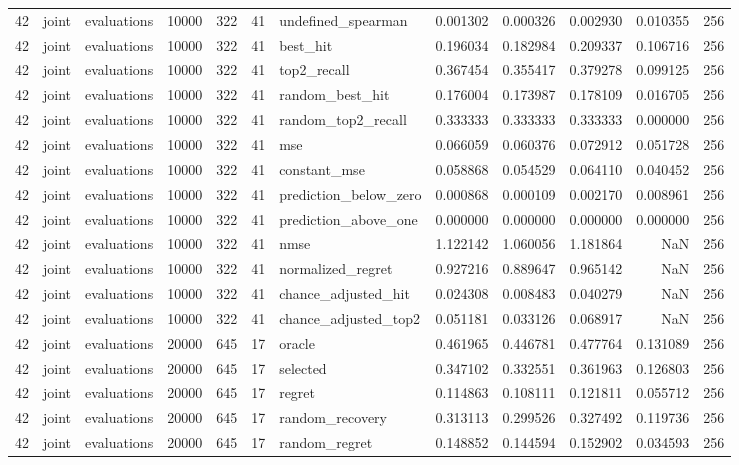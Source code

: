 \begin{tabular}{rllrrrlrrrrr}
42 & joint & evaluations & 10000 & 322 & 41 & undefined_spearman & 0.001302 & 0.000326 & 0.002930 & 0.010355 & 256 \\
42 & joint & evaluations & 10000 & 322 & 41 & best_hit & 0.196034 & 0.182984 & 0.209337 & 0.106716 & 256 \\
42 & joint & evaluations & 10000 & 322 & 41 & top2_recall & 0.367454 & 0.355417 & 0.379278 & 0.099125 & 256 \\
42 & joint & evaluations & 10000 & 322 & 41 & random_best_hit & 0.176004 & 0.173987 & 0.178109 & 0.016705 & 256 \\
42 & joint & evaluations & 10000 & 322 & 41 & random_top2_recall & 0.333333 & 0.333333 & 0.333333 & 0.000000 & 256 \\
42 & joint & evaluations & 10000 & 322 & 41 & mse & 0.066059 & 0.060376 & 0.072912 & 0.051728 & 256 \\
42 & joint & evaluations & 10000 & 322 & 41 & constant_mse & 0.058868 & 0.054529 & 0.064110 & 0.040452 & 256 \\
42 & joint & evaluations & 10000 & 322 & 41 & prediction_below_zero & 0.000868 & 0.000109 & 0.002170 & 0.008961 & 256 \\
42 & joint & evaluations & 10000 & 322 & 41 & prediction_above_one & 0.000000 & 0.000000 & 0.000000 & 0.000000 & 256 \\
42 & joint & evaluations & 10000 & 322 & 41 & nmse & 1.122142 & 1.060056 & 1.181864 & NaN & 256 \\
42 & joint & evaluations & 10000 & 322 & 41 & normalized_regret & 0.927216 & 0.889647 & 0.965142 & NaN & 256 \\
42 & joint & evaluations & 10000 & 322 & 41 & chance_adjusted_hit & 0.024308 & 0.008483 & 0.040279 & NaN & 256 \\
42 & joint & evaluations & 10000 & 322 & 41 & chance_adjusted_top2 & 0.051181 & 0.033126 & 0.068917 & NaN & 256 \\
42 & joint & evaluations & 20000 & 645 & 17 & oracle & 0.461965 & 0.446781 & 0.477764 & 0.131089 & 256 \\
42 & joint & evaluations & 20000 & 645 & 17 & selected & 0.347102 & 0.332551 & 0.361963 & 0.126803 & 256 \\
42 & joint & evaluations & 20000 & 645 & 17 & regret & 0.114863 & 0.108111 & 0.121811 & 0.055712 & 256 \\
42 & joint & evaluations & 20000 & 645 & 17 & random_recovery & 0.313113 & 0.299526 & 0.327492 & 0.119736 & 256 \\
42 & joint & evaluations & 20000 & 645 & 17 & random_regret & 0.148852 & 0.144594 & 0.152902 & 0.034593 & 256 \\

\end{tabular}
